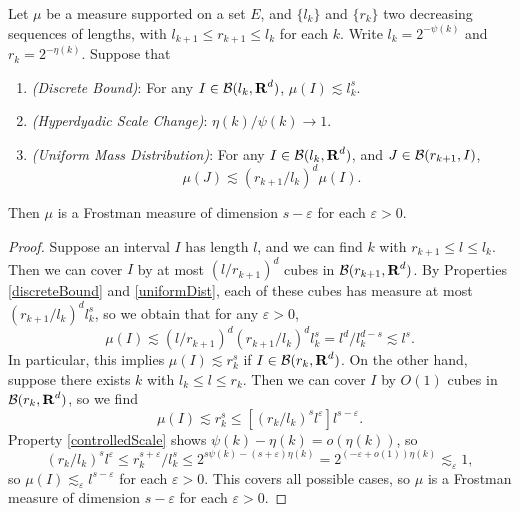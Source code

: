 \begin{theorem} \label{uniformHausdorffResult}
    Let $\mu$ be a measure supported on a set $E$, and $\{ l_k \}$ and $\{ r_k \}$ two decreasing sequences of lengths, with $l_{k+1} \leq r_{k+1} \leq l_k$ for each $k$. Write $l_k = 2^{-\psi(k)}$ and $r_k = 2^{-\eta(k)}$. Suppose that
    \begin{enumerate}
    	\item \label{discreteBound} \emph{(Discrete Bound)}: For any $I \in \operatorname{\mathcal{B}}(l_k,\operatorname{\mathbf{R}}^d)$, $\mu(I) \lesssim l_k^s$.
    	\item \label{controlledScale} \emph{(Hyperdyadic Scale Change)}: $\eta(k)/\psi(k) \to 1$.
    	\item \label{uniformDist} \emph{(Uniform Mass Distribution)}: For any $I \in \operatorname{\mathcal{B}}(l_k,\operatorname{\mathbf{R}}^d)$, and $J \in \operatorname{\mathcal{B}}(r_{k+1},I)$,
    	\[ \mu(J) \lesssim (r_{k+1}/l_k)^d \mu(I). \]
    \end{enumerate}
	Then $\mu$ is a Frostman measure of dimension $s-\varepsilon$ for each $\varepsilon > 0$.
\end{theorem}
\begin{proof}
	Suppose an interval $I$ has length $l$, and we can find $k$ with $r_{k+1} \leq l \leq l_k$. Then we can cover $I$ by at most $(l/r_{k+1})^d$ cubes in $\operatorname{\mathcal{B}}(r_{k+1},\operatorname{\mathbf{R}}^d)$. By Properties \ref{discreteBound} and \ref{uniformDist}, each of these cubes has measure at most $(r_{k+1}/l_k)^d l_k^s$, so we obtain that for any $\varepsilon > 0$,
    \[ \mu(I) \lesssim (l/r_{k+1})^d (r_{k+1}/l_k)^d l_k^s = l^d / l_k^{d-s} \lesssim l^s. \]
    In particular, this implies $\mu(I) \lesssim r_k^s$ if $I \in \operatorname{\mathcal{B}}(r_k,\operatorname{\mathbf{R}}^d)$. On the other hand, suppose there exists $k$ with $l_k \leq l \leq r_k$. Then we can cover $I$ by $O(1)$ cubes in $\operatorname{\mathcal{B}}(r_k,\operatorname{\mathbf{R}}^d)$, so we find
    \[ \mu(I) \lesssim r_k^s \leq [(r_k/l_k)^s l^\varepsilon] l^{s-\varepsilon}. \]
    Property \ref{controlledScale} shows $\psi(k) - \eta(k) = o(\eta(k))$, so
    \[ (r_k/l_k)^s l^\varepsilon \leq r_k^{s+\varepsilon} / l_k^s \leq 2^{s \psi(k) -(s+\varepsilon) \eta(k)} = 2^{(- \varepsilon + o(1)) \eta(k)} \lesssim_\varepsilon 1, \]
    so $\mu(I) \lesssim_\varepsilon l^{s-\varepsilon}$ for each $\varepsilon > 0$. This covers all possible cases, so $\mu$ is a Frostman measure of dimension $s-\varepsilon$ for each $\varepsilon > 0$.
\end{proof}

